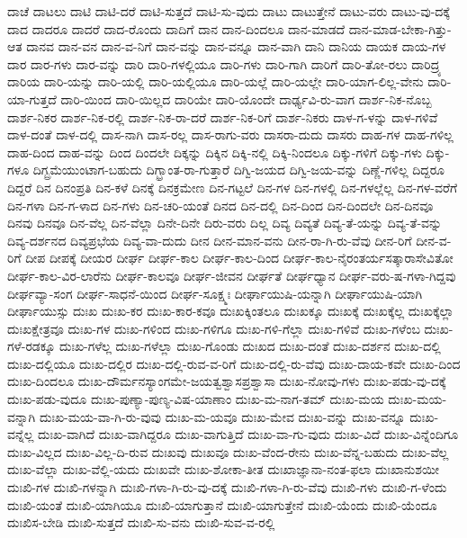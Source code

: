 {ದಾಚೆ
ದಾಟಲು
ದಾಟಿ
ದಾಟಿ-ದರೆ
ದಾಟಿ-ಸುತ್ತದೆ
ದಾಟಿ-ಸು-ವುದು
ದಾಟು
ದಾಟುತ್ತೇನೆ
ದಾಟು-ವರು
ದಾಟು-ವು-ದಕ್ಕೆ
ದಾದ
ದಾದರೂ
ದಾದರೆ
ದಾದ-ರೊಂದು
ದಾದಿಗೆ
ದಾನ
ದಾನ-ದಿಂದಲೂ
ದಾನ-ಮಾಡದೆ
ದಾನ-ಮಾಡ-ಬೇಕಾ-ಗಿತ್ತು-ಆತ
ದಾನವ
ದಾನ-ವನ
ದಾನ-ವ-ನಿಗೆ
ದಾನ-ವನ್ನು
ದಾನ-ವನ್ನೂ
ದಾನ-ವಾಗಿ
ದಾನಿ
ದಾನಿಯ
ದಾಯಕ
ದಾಯ-ಗಳ
ದಾರ
ದಾರ-ಗಳು
ದಾರ-ವನ್ನು
ದಾರಿ
ದಾರಿ-ಗಳಲ್ಲಿಯೂ
ದಾರಿ-ಗಳು
ದಾರಿ-ಗಾಗಿ
ದಾರಿಗೆ
ದಾರಿ-ತೋ-ರಲು
ದಾರಿದ್ರ್ಯ
ದಾರಿಯ
ದಾರಿ-ಯನ್ನು
ದಾರಿ-ಯಲ್ಲಿ
ದಾರಿ-ಯಲ್ಲಿಯೂ
ದಾರಿ-ಯಲ್ಲೆ
ದಾರಿ-ಯಲ್ಲೇ
ದಾರಿ-ಯಾಗ-ಲಿಲ್ಲ-ವೇನು
ದಾರಿ-ಯಾ-ಗುತ್ತದೆ
ದಾರಿ-ಯಿಂದ
ದಾರಿ-ಯಿಲ್ಲದ
ದಾರಿಯೇ
ದಾರಿ-ಯೊಂದೇ
ದಾರ್ಢ್ಯವಿ-ರು-ವಾಗ
ದಾರ್ಶ-ನಿಕ-ನೊಬ್ಬ
ದಾರ್ಶ-ನಿಕರ
ದಾರ್ಶ-ನಿಕ-ರಲ್ಲಿ
ದಾರ್ಶ-ನಿಕ-ರಾ-ದರೆ
ದಾರ್ಶ-ನಿಕ-ರಿಗೆ
ದಾರ್ಶ-ನಿಕರು
ದಾಳ-ಗ-ಳನ್ನು
ದಾಳ-ಗಳಿವೆ
ದಾಳ-ದಂತೆ
ದಾಳ-ದಲ್ಲಿ
ದಾಸ-ನಾಗಿ
ದಾಸ-ರಲ್ಲ
ದಾಸ-ರಾಗು-ವರು
ದಾಸರಾ-ದುದು
ದಾಸರು
ದಾಹ-ಗಳ
ದಾಹ-ಗಳಿಲ್ಲ
ದಾಹ-ದಿಂದ
ದಾಹ-ವನ್ನು
ದಿಂದ
ದಿಂದಲೇ
ದಿಕ್ಕನ್ನು
ದಿಕ್ಕಿನ
ದಿಕ್ಕಿ-ನಲ್ಲಿ
ದಿಕ್ಕಿ-ನಿಂದಲೂ
ದಿಕ್ಕು-ಗಳಿಗೆ
ದಿಕ್ಕು-ಗಳು
ದಿಕ್ಕು-ಗಳೂ
ದಿಗ್ಬ್ರಮೆಯುಂಟಾಗ-ಬಹುದು
ದಿಗ್ಭ್ರಾಂತ-ರಾ-ಗುತ್ತಾರೆ
ದಿಗ್ವಿ-ಜಯದ
ದಿಗ್ವಿ-ಜಯ-ವನ್ನು
ದಿಣ್ಣೆ-ಗಳಿಲ್ಲ
ದಿದ್ದರೂ
ದಿದ್ದರೆ
ದಿನ
ದಿನಂಪ್ರತಿ
ದಿನ-ಕಳೆ
ದಿನಕ್ಕೆ
ದಿನಕ್ರಮೇಣ
ದಿನ-ಗಟ್ಟಲೆ
ದಿನ-ಗಳ
ದಿನ-ಗಳಲ್ಲಿ
ದಿನ-ಗಳಲ್ಲೆಲ್ಲ
ದಿನ-ಗಳ-ವರೆಗೆ
ದಿನ-ಗಳಾ
ದಿನ-ಗ-ಳಾದ
ದಿನ-ಗಳು
ದಿನ-ಚರಿ-ಯಂತೆ
ದಿನದ
ದಿನ-ದಲ್ಲಿ
ದಿನ-ದಿಂದ
ದಿನ-ದಿಂದಲೇ
ದಿನ-ದಿನವೂ
ದಿನವು
ದಿನವೂ
ದಿನ-ವೆಲ್ಲ
ದಿನ-ವೆಲ್ಲಾ
ದಿನೇ-ದಿನೇ
ದಿರು-ವರು
ದಿಲ್ಲ
ದಿವ್ಯ
ದಿವ್ಯತೆ
ದಿವ್ಯ-ತೆ-ಯನ್ನು
ದಿವ್ಯ-ತೆ-ವನ್ನು
ದಿವ್ಯ-ದರ್ಶನದ
ದಿವ್ಯಪ್ರಭೆಯ
ದಿವ್ಯ-ವಾ-ದುದು
ದೀನ
ದೀನ-ಮಾನ-ವನು
ದೀನ-ರಾ-ಗಿ-ರು-ವೆವು
ದೀನ-ರಿಗೆ
ದೀನ-ವ-ರಿಗೆ
ದೀಪ
ದೀಪಕ್ಕೆ
ದೀಯರ
ದೀರ್ಘ
ದೀರ್ಘ-ಕಾಲ
ದೀರ್ಘ-ಕಾಲ-ದಿಂದ
ದೀರ್ಘ-ಕಾಲ-ನೈರಂತರ್ಯಸತ್ಕಾರಾಸೇವಿತೋ
ದೀರ್ಘ-ಕಾಲ-ವಿರ-ಲಾರೆನು
ದೀರ್ಘ-ಕಾಲವೂ
ದೀರ್ಘ-ಜೀವನ
ದೀರ್ಘತೆ
ದೀರ್ಘಧ್ಯಾನ
ದೀರ್ಘ-ವರು-ಷ-ಗಳಾ-ಗಿದ್ದವು
ದೀರ್ಘವ್ಯಾ-ಸಂಗ
ದೀರ್ಘ-ಸಾಧನೆ-ಯಿಂದ
ದೀರ್ಘ-ಸೂಕ್ಷ್ಮಃ
ದೀರ್ಘಾಯುಷಿ-ಯನ್ನಾಗಿ
ದೀರ್ಘಾಯುಷಿ-ಯಾಗಿ
ದೀರ್ಘಾಯುಸ್ಸು
ದುಃಖ
ದುಃಖ-ಕರ
ದುಃಖ-ಕಾರ-ಕವೂ
ದುಃಖಕ್ಕಿಂತಲೂ
ದುಃಖಕ್ಕೂ
ದುಃಖಕ್ಕೆ
ದುಃಖಕ್ಕೆಲ್ಲ
ದುಃಖಕ್ಕೆಲ್ಲಾ
ದುಃಖಕ್ಷೇತ್ರವೂ
ದುಃಖ-ಗಳ
ದುಃಖ-ಗಳಿಂದ
ದುಃಖ-ಗಳಿಗೂ
ದುಃಖ-ಗಳಿ-ಗೆಲ್ಲಾ
ದುಃಖ-ಗಳಿವೆ
ದುಃಖ-ಗಳೆಂಬ
ದುಃಖ-ಗಳೆ-ರಡಕ್ಕೂ
ದುಃಖ-ಗಳೆಲ್ಲ
ದುಃಖ-ಗಳೆಲ್ಲಾ
ದುಃಖ-ಗೊಂಡು
ದುಃಖದ
ದುಃಖ-ದಂತೆ
ದುಃಖ-ದರ್ಶನ
ದುಃಖ-ದಲ್ಲಿ
ದುಃಖ-ದಲ್ಲಿಯೂ
ದುಃಖ-ದಲ್ಲಿರ
ದುಃಖ-ದಲ್ಲಿ-ರುವ-ವ-ರಿಗೆ
ದುಃಖ-ದಲ್ಲಿ-ರು-ವೆವು
ದುಃಖ-ದಾಯ-ಕವೇ
ದುಃಖ-ದಿಂದ
ದುಃಖ-ದಿಂದಲೂ
ದುಃಖ-ದೌರ್ಮನಸ್ಯಾಂಗಮೇ-ಜಯತ್ವಶ್ವಾಸಪ್ರಶ್ವಾಸಾ
ದುಃಖ-ನೋವು-ಗಳು
ದುಃಖ-ಪಡು-ವು-ದಕ್ಕೆ
ದುಃಖ-ಪಡು-ವುದೂ
ದುಃಖ-ಪುಣ್ಯಾ-ಪುಣ್ಯ-ವಿಷ-ಯಾಣಾಂ
ದುಃಖ-ಮ-ನಾಗ-ತಮ್
ದುಃಖ-ಮಯ
ದುಃಖ-ಮಯ-ವನ್ನಾಗಿ
ದುಃಖ-ಮಯ-ವಾ-ಗಿ-ರು-ವುವು
ದುಃಖ-ಮ-ಯವೂ
ದುಃಖ-ಮೇವ
ದುಃಖ-ವನ್ನು
ದುಃಖ-ವನ್ನೂ
ದುಃಖ-ವನ್ನೆಲ್ಲ
ದುಃಖ-ವಾಗಿದೆ
ದುಃಖ-ವಾಗಿದ್ದರೂ
ದುಃಖ-ವಾಗುತ್ತಿದೆ
ದುಃಖ-ವಾ-ಗು-ವುದು
ದುಃಖ-ವಿದೆ
ದುಃಖ-ವಿನ್ನೆಂದಿಗೂ
ದುಃಖ-ವಿಲ್ಲದ
ದುಃಖ-ವಿಲ್ಲ-ದಿ-ರುವ
ದುಃಖವು
ದುಃಖವೂ
ದುಃಖ-ವೆಂದ-ರೇನು
ದುಃಖ-ವೆನ್ನ-ಬಹುದು
ದುಃಖ-ವೆಲ್ಲ
ದುಃಖ-ವೆಲ್ಲಾ
ದುಃಖ-ವೆಲ್ಲಿ-ಯದು
ದುಃಖವೇ
ದುಃಖ-ಶೋಕಾ-ತೀತ
ದುಃಖಾಜ್ಞಾನಾ-ನಂತ-ಫಲಾ
ದುಃಖಾನುಶಯೀ
ದುಃಖಿ-ಗಳ
ದುಃಖಿ-ಗಳನ್ನಾಗಿ
ದುಃಖಿ-ಗಳಾ-ಗಿ-ರು-ವು-ದಕ್ಕೆ
ದುಃಖಿ-ಗಳಾ-ಗಿ-ರು-ವೆವು
ದುಃಖಿ-ಗಳು
ದುಃಖಿ-ಗ-ಳೆಂದು
ದುಃಖಿ-ಯಂತೆ
ದುಃಖಿ-ಯಾಗಿಯೂ
ದುಃಖಿ-ಯಾಗುತ್ತಾನೆ
ದುಃಖಿ-ಯಾಗುತ್ತೇನೆ
ದುಃಖಿ-ಯೆಂದು
ದುಃಖಿ-ಯೆಂದೂ
ದುಃಖಿಸ-ಬೇಡಿ
ದುಃಖಿ-ಸುತ್ತದೆ
ದುಃಖಿ-ಸು-ವನು
ದುಃಖಿ-ಸುವ-ವ-ರಲ್ಲಿ
}

